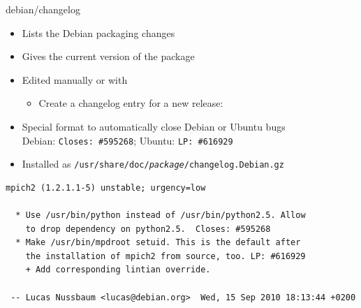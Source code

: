 \documentclass[10pt,final]{beamer}
\begin{document}
\begin{frame}[fragile]{debian/changelog}
  \begin{itemize}
  \item Lists the Debian packaging changes
  \item Gives the current version of the package
  \begin{center}
\end{center}


  \item Edited manually or with 
  \begin{itemize}
	  \item Create a changelog entry for a new release: 
  \end{itemize}
  \item Special format to automatically close Debian or Ubuntu bugs\\
    Debian: \texttt{Closes:~\#595268}; Ubuntu: \texttt{LP:~\#616929}
  \item Installed as \texttt{/usr/share/doc/\textit{package}/changelog.Debian.gz}
  \end{itemize}
  \seprule
  \begin{lstlisting}[basicstyle=\ttfamily\footnotesize]
mpich2 (1.2.1.1-5) unstable; urgency=low

  * Use /usr/bin/python instead of /usr/bin/python2.5. Allow
    to drop dependency on python2.5.  Closes: #595268
  * Make /usr/bin/mpdroot setuid. This is the default after
    the installation of mpich2 from source, too. LP: #616929
    + Add corresponding lintian override.

 -- Lucas Nussbaum <lucas@debian.org>  Wed, 15 Sep 2010 18:13:44 +0200
\end{lstlisting}
\end{frame}
\end{document}
